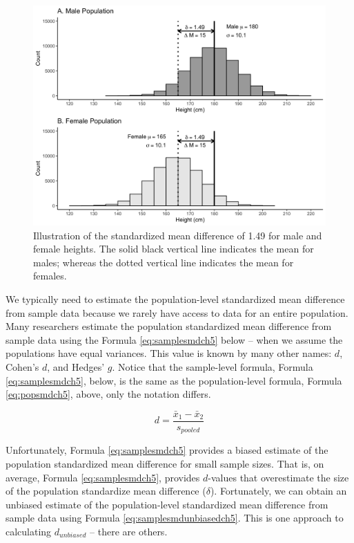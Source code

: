 \documentclass[
]{krantz}
\begin{document}
\begin{figure}
\includegraphics[width=0.95\linewidth]{ch_samples/images/sex_pops} \caption[Illustration of standardized mean difference of $\delta =1.49$]{Illustration of the standardized mean difference of 1.49 for male and female heights. The solid black vertical line indicates the mean for males; whereas the dotted vertical line indicates the mean for females.}\label{fig:sexpop}
\end{figure}

We typically need to estimate the population-level standardized mean difference from sample data because we rarely have access to data for an entire population. Many researchers estimate the population standardized mean difference from sample data using the Formula \eqref{eq:samplesmdch5} below -- when we assume the populations have equal variances. This value is known by many other names: \(d\), Cohen's \(d\), and Hedges' \(g\). Notice that the sample-level formula, Formula \eqref{eq:samplesmdch5}, below, is the same as the population-level formula, Formula \eqref{eq:popsmdch5}, above, only the notation differs.

\begin{equation} 
d  = \frac{\bar{x}_{1} - \bar{x}_{2}}{s_{pooled}} 
      \label{eq:samplesmdch5}
\end{equation}

Unfortunately, Formula \eqref{eq:samplesmdch5} provides a biased estimate of the population standardized mean difference for small sample sizes. That is, on average, Formula \eqref{eq:samplesmdch5}, provides \(d\)-values that overestimate the size of the population standardize mean difference (\(\delta\)). Fortunately, we can obtain an unbiased estimate of the population-level standardized mean difference from sample data using Formula \eqref{eq:samplesmdunbiasedch5}. This is one approach to calculating \(d_{unbiased}\) -- there are others.
\end{document}
